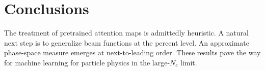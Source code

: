 \section{Conclusions}\label{sec:conclusions}

The treatment of pretrained attention maps is admittedly heuristic. A
natural next step is to generalize beam functions at the percent level.
An approximate phase-space measure emerges at next-to-leading order.
These results pave the way for machine learning for particle physics in
the large-$N_c$ limit.

